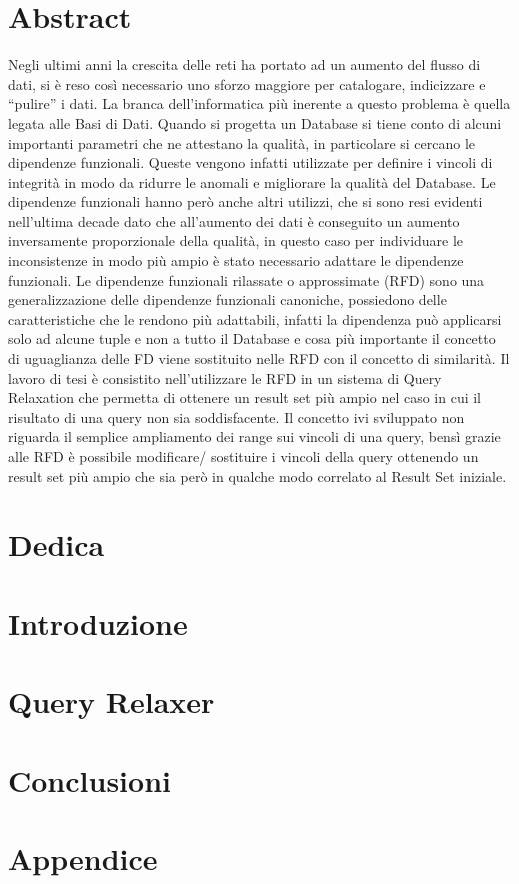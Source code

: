 \documentclass[12pt,oneside]{report}
\begin{document}

\chapter{Abstract}
Negli ultimi anni la crescita delle reti ha portato ad un aumento del flusso di dati, si è reso così necessario uno sforzo maggiore per catalogare, indicizzare e “pulire” i  dati. 
La branca dell’informatica più inerente a questo problema è quella legata alle Basi di Dati. 
Quando si progetta un Database si tiene conto di alcuni importanti parametri che ne attestano la qualità, in particolare si cercano le dipendenze funzionali. Queste vengono infatti utilizzate per definire i vincoli di integrità in modo da ridurre le anomali e migliorare la qualità del Database.
Le dipendenze funzionali hanno però anche altri utilizzi, che si sono resi evidenti nell’ultima decade dato che all’aumento dei dati è conseguito un aumento inversamente proporzionale della qualità, in questo caso per individuare le inconsistenze in modo più ampio è stato necessario adattare le dipendenze funzionali.
Le dipendenze funzionali rilassate o approssimate (RFD) sono una generalizzazione delle dipendenze funzionali canoniche, possiedono delle caratteristiche che le rendono più adattabili, infatti la dipendenza può applicarsi solo ad alcune tuple e non a tutto il Database e cosa più importante il concetto di uguaglianza delle FD viene sostituito nelle RFD con il concetto di similarità. 
Il lavoro di tesi è consistito nell’utilizzare le RFD in un sistema di Query Relaxation che permetta di ottenere un result set più ampio nel caso in cui il risultato di una query non sia soddisfacente.
Il concetto ivi sviluppato non riguarda il semplice ampliamento dei range sui vincoli di una query, bensì grazie alle RFD è possibile modificare/ sostituire i vincoli della query ottenendo un result set più ampio che sia però in qualche modo correlato al Result Set iniziale.

\chapter*{Dedica}


\tableofcontents

\chapter{Introduzione}


\chapter{Query Relaxer}


\chapter{Conclusioni}


\appendix
\chapter{Appendice}


\listoffigures



\end{document}
